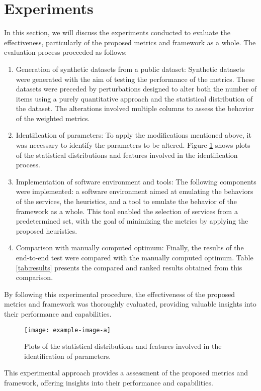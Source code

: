 \section{Experiments}\label{sec:experiment}
In this section, we will discuss the experiments conducted to evaluate the effectiveness, particularly of the proposed metrics and framework as a whole. The evaluation process proceeded as follows:

\begin{enumerate}
  \item Generation of synthetic datasets from a public dataset: Synthetic datasets were generated with the aim of testing the performance of the metrics. These datasets were preceded by perturbations designed to alter both the number of items using a purely quantitative approach and the statistical distribution of the dataset. The alterations involved multiple columns to assess the behavior of the weighted metrics.
  \item Identification of parameters: To apply the modifications mentioned above, it was necessary to identify the parameters to be altered. Figure \ref{fig:distributions} shows plots of the statistical distributions and features involved in the identification process.
  \item Implementation of software environment and tools: The following components were implemented: a software environment aimed at emulating the behaviors of the services, the heuristics, and a tool to emulate the behavior of the framework as a whole. This tool enabled the selection of services from a predetermined set, with the goal of minimizing the metrics by applying the proposed heuristics.
  \item Comparison with manually computed optimum: Finally, the results of the end-to-end test were compared with the manually computed optimum. Table \ref{tab:results} presents the compared and ranked results obtained from this comparison.
\end{enumerate}

By following this experimental procedure, the effectiveness of the proposed metrics and framework was thoroughly evaluated, providing valuable insights into their performance and capabilities.

\begin{figure}[ht]
  \centering
  \texttt{[image: example-image-a]}
  \caption{Plots of the statistical distributions and features involved in the identification of parameters.}
  \label{fig:distributions}
\end{figure}



This experimental approach provides a assessment of the proposed metrics and framework, offering insights into their performance and capabilities.
